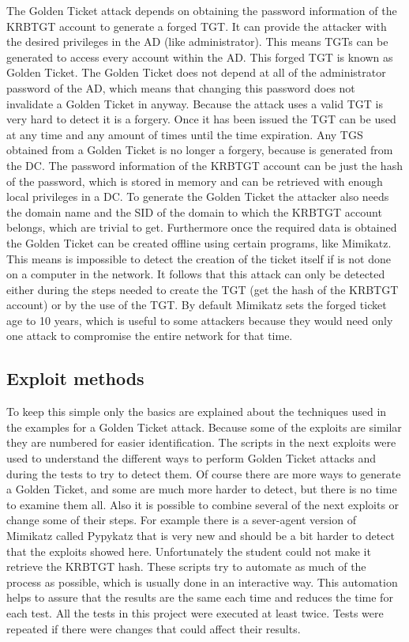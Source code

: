 \linej
The Golden Ticket attack depends on obtaining the password information of the KRBTGT account to generate a forged TGT. It can provide the attacker with the desired privileges in the AD (like administrator).
\linej
This means TGTs can be generated to access every account within the AD. This forged TGT is known as Golden Ticket.
The Golden Ticket does not depend at all of the administrator password of the AD, which means that changing this password does not invalidate a Golden Ticket in anyway.
\linej
\linej
Because the attack uses a valid TGT is very hard to detect it is a forgery. Once it has been issued the TGT can be used at any time and any amount of times until the time expiration.
Any TGS obtained from a Golden Ticket is no longer a forgery, because is generated from the DC.
\linej
\linej
The password information of the KRBTGT account can be just the hash of the password, which is stored in memory and can be retrieved with enough local privileges in a DC. To generate the Golden Ticket the attacker also needs the domain name and the SID of the domain to which the KRBTGT account belongs, which are trivial to get\cite{stealthbits}.
\linej
Furthermore once the required data is obtained the Golden Ticket can be created offline using certain programs, like Mimikatz. This means is impossible to detect the creation of the ticket itself if is not done on a computer in the network.
\linej
It follows that this attack can only be detected either during the steps needed to create the TGT (get the hash of the KRBTGT account) or by the use of the TGT.
\linej
\linej
By default Mimikatz sets the forged ticket age to 10 years, which is useful to some attackers because they would need only one attack to compromise the entire network for that time.

\subsection{Exploit methods}
To keep this simple only the basics are explained about the techniques used in the examples for a Golden Ticket attack. Because some of the exploits are similar they are numbered for easier identification. The scripts in the next exploits were used to understand the different ways to perform Golden Ticket attacks and during the tests to try to detect them. Of course there are more ways to generate a Golden Ticket, and some are much more harder to detect, but there is no time to examine them all. Also it is possible to combine several of the next exploits or change some of their steps.
\linej
For example there is a sever-agent version of Mimikatz called Pypykatz\cite{pypykatz_agent}\cite{pypykatz_server} that is very new and should be a bit harder to detect that the exploits showed here. Unfortunately the student could not make it retrieve the KRBTGT hash.
\linej
\linej
These scripts try to automate as much of the process as possible, which is usually done in an interactive way. This automation helps to assure that the results are the same each time and reduces the time for each test. All the tests in this project were executed at least twice. Tests were repeated if there were changes that could affect their results.

